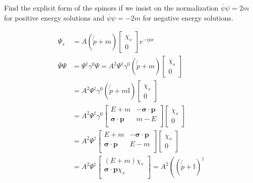 \documentclass[working, oneside]{../../../Preambles/tuftebook}
\begin{document}
\begin{exercise}[1]
Find the explicit form of the spinors if we insist on the normalization \( \overline{\psi} \psi = 2m \) for positive energy solutions and \( \overline{\psi} \psi = -2m \) for negative energy solutions.
\end{exercise}
\begin{solution}
\begin{align*}
\Psi_s
&= A (\not{p} + m) \begin{bmatrix} \chi_s \\ 0 \end{bmatrix} e^{-i p x} \\
\overline{\Psi} \Psi
&= \Psi^\dagger \gamma^0 \Psi = A^2 \Psi^\dagger \gamma^0 (\not{p} + m) \begin{bmatrix} \chi_s \\ 0 \end{bmatrix} \\
&= A^2 \Psi^\dagger \gamma^0 (\not{p} + m\mathbb{I}) \begin{bmatrix} \chi_s \\ 0 \end{bmatrix} \\
&= A^2 \Psi^\dagger \gamma^0 \begin{bmatrix}
    E+m & -\mathbf{\sigma}\cdot \mathbf{p} \\
     \mathbf{\sigma}\cdot \mathbf{p}& m -E  \\
\end{bmatrix}
\begin{bmatrix} \chi_s \\ 0 \end{bmatrix} \\
&= A^2 \Psi^\dagger  \begin{bmatrix}
    E+m & -\mathbf{\sigma}\cdot \mathbf{p} \\
     \mathbf{\sigma}\cdot \mathbf{p}& E - m  \\
\end{bmatrix}
\begin{bmatrix} \chi_s \\ 0 \end{bmatrix} \\
&= A^2 \Psi^\dagger 
\begin{bmatrix}
    \left( E + m \right) \chi _s  \\
    \mathbf{\sigma}\cdot \mathbf{p }\chi _s \\
\end{bmatrix} = A^2 \left( \left( \not{p} + \mathbb{I} \right) ^\dagger

\end{align*}
\end{solution}
\end{document}
